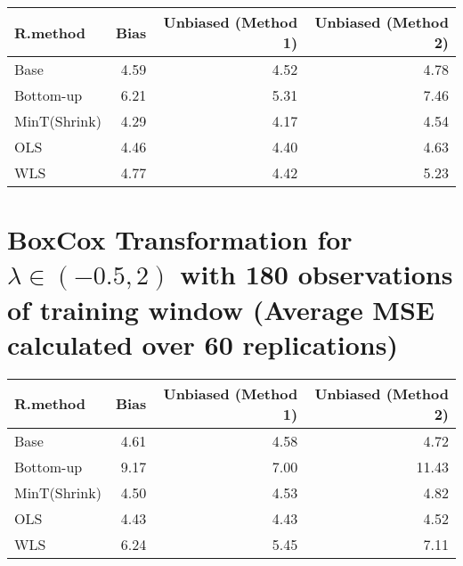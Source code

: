 \documentclass[]{article}
\begin{document}
\begin{tabular}{l|r|r|r}
\hline
R.method & Bias & Unbiased (Method 1) & Unbiased (Method 2)\\
\hline
Base & 4.59 & 4.52 & 4.78\\
\hline
Bottom-up & 6.21 & 5.31 & 7.46\\
\hline
MinT(Shrink) & 4.29 & 4.17 & 4.54\\
\hline
OLS & 4.46 & 4.40 & 4.63\\
\hline
WLS & 4.77 & 4.42 & 5.23\\
\hline
\end{tabular}

\section{\texorpdfstring{BoxCox Transformation for
\(\lambda \in (-0.5,2)\) with 180 observations of training window
(Average MSE calculated over 60
replications)}{BoxCox Transformation for \textbackslash{}lambda \textbackslash{}in (-0.5,2) with 180 observations of training window (Average MSE calculated over 60 replications)}}\label{boxcox-transformation-for-lambda-in--0.52-with-180-observations-of-training-window-average-mse-calculated-over-60-replications}

\begin{tabular}{l|r|r|r}
\hline
R.method & Bias & Unbiased (Method 1) & Unbiased (Method 2)\\
\hline
Base & 4.61 & 4.58 & 4.72\\
\hline
Bottom-up & 9.17 & 7.00 & 11.43\\
\hline
MinT(Shrink) & 4.50 & 4.53 & 4.82\\
\hline
OLS & 4.43 & 4.43 & 4.52\\
\hline
WLS & 6.24 & 5.45 & 7.11\\
\hline
\end{tabular}
\end{document}
